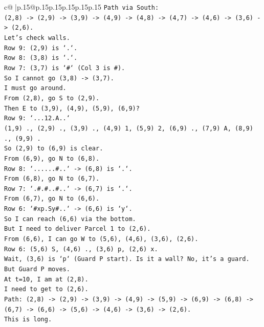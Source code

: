 \documentclass{article}
\begin{document}
{\begin{supertabular}{c@{$\;$}|p{.15\linewidth}@{}p{.15\linewidth}p{.15\linewidth}p{.15\linewidth}p{.15\linewidth}p{.15\linewidth}}
{{{\texttt{Path via South:} \\
\texttt{(2,8) {-}> (2,9) {-}> (3,9) {-}> (4,9) {-}> (4,8) {-}> (4,7) {-}> (4,6) {-}> (3,6) {-}> (2,6).} \\
\texttt{Let's check walls.} \\
\texttt{Row 9: (2,9) is `.`.} \\
\texttt{Row 8: (3,8) is `.`.} \\
\texttt{Row 7: (3,7) is `\#` (Col 3 is \#).} \\
\texttt{So I cannot go (3,8) {-}> (3,7).} \\
\texttt{I must go around.} \\
\texttt{From (2,8), go S to (2,9).} \\
\texttt{Then E to (3,9), (4,9), (5,9), (6,9)?} \\
\texttt{Row 9: `...12.A..`} \\
\texttt{(1,9) ., (2,9) ., (3,9) ., (4,9) 1, (5,9) 2, (6,9) ., (7,9) A, (8,9) ., (9,9) .} \\
\texttt{So (2,9) to (6,9) is clear.} \\
\texttt{From (6,9), go N to (6,8).} \\
\texttt{Row 8: `......\#..` {-}> (6,8) is `.`.} \\
\texttt{From (6,8), go N to (6,7).} \\
\texttt{Row 7: `.\#.\#..\#..` {-}> (6,7) is `.`.} \\
\texttt{From (6,7), go N to (6,6).} \\
\texttt{Row 6: `\#xp.Sy\#..` {-}> (6,6) is `y`.} \\
\texttt{So I can reach (6,6) via the bottom.} \\
\texttt{But I need to deliver Parcel 1 to (2,6).} \\
\texttt{From (6,6), I can go W to (5,6), (4,6), (3,6), (2,6).} \\
\texttt{Row 6: (5,6) S, (4,6) ., (3,6) p, (2,6) x.} \\
\texttt{Wait, (3,6) is `p` (Guard P start). Is it a wall? No, it's a guard.} \\
\texttt{But Guard P moves.} \\
\texttt{At t=10, I am at (2,8).} \\
\texttt{I need to get to (2,6).} \\
\texttt{Path: (2,8) {-}> (2,9) {-}> (3,9) {-}> (4,9) {-}> (5,9) {-}> (6,9) {-}> (6,8) {-}> (6,7) {-}> (6,6) {-}> (5,6) {-}> (4,6) {-}> (3,6) {-}> (2,6).} \\
\texttt{This is long.} \\
}}}
\end{supertabular}}
\end{document}
